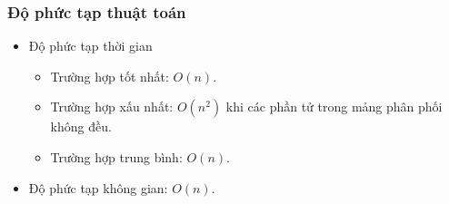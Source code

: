 \subsubsection{Độ phức tạp thuật toán}

\begin{itemize}
	\item Độ phức tạp thời gian
	\begin{itemize}[label=$\circ$]
		\item Trường hợp tốt nhất: $O(n)$.
		\item Trường hợp xấu nhất: $O(n^2)$ khi các phần tử trong mảng phân phối không đều.
		\item Trường hợp trung bình: $O(n)$. 
	\end{itemize}
	
	\item Độ phức tạp không gian: $O(n)$.
\end{itemize}
